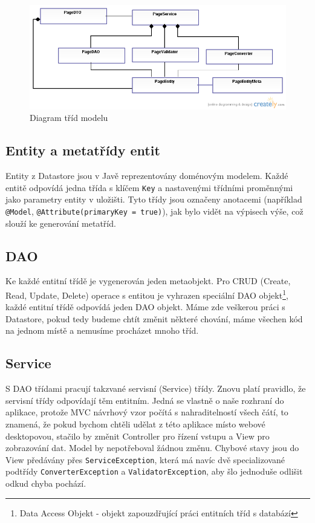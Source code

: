 \begin{figure}[h]
\begin{center}
\includegraphics[width=5in]{figures/cms-uml.png}
\caption{Diagram tříd modelu}
\label{fig:modelUml}
\end{center}
\end{figure}

\subsection{Entity a metatřídy entit}
Entity z Datastore jsou v Javě reprezentovány doménovým modelem. Každé entitě odpovídá jedna třída s klíčem \verb|Key| a nastavenými třídními proměnnými jako parametry entity v uložišti. Tyto třídy jsou označeny anotacemi (například \verb|@Model|, \verb|@Attribute(primaryKey = true)|), jak bylo vidět na výpisech výše, což slouží ke generování metatříd. 

\subsection{DAO}
Ke každé entitní třídě je vygenerován jeden metaobjekt. Pro CRUD (Create, Read, Update, Delete) operace s entitou je vyhrazen speciální DAO objekt\footnote{Data Access Objekt - objekt zapouzdřující práci entitních tříd s databází}, každé entitní třídě odpovídá jeden DAO objekt. Máme zde veškerou práci s Datastore, pokud tedy budeme chtít změnit některé chování, máme všechen kód na jednom místě a nemusíme procházet mnoho tříd. 

\subsection{Service}
S DAO třídami pracují takzvané servisní (Service) třídy. Znovu platí pravidlo, že servisní třídy odpovídají těm entitním. Jedná se vlastně o naše rozhraní do aplikace, protože MVC návrhový vzor počítá s nahraditelností všech čátí, to znamená, že pokud bychom chtěli udělat z této aplikace místo webové desktopovou, stačilo by změnit Controller pro řízení vstupu a View pro zobrazování dat. Model by nepotřeboval žádnou změnu. Chybové stavy jsou do View předávány přes \verb|ServiceException|, která má navíc dvě specializované podtřídy \verb|ConverterException| a \verb|ValidatorException|, aby šlo jednoduše odlišit odkud chyba pochází. 

